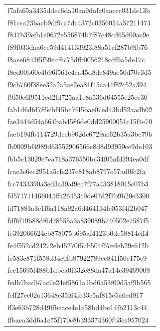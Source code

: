 \begin{tabular}{l}
f7afa65a3435ddee6da10aa9dafa0aaccc031de13b \\
f81cca23bacb9df9ca7dc4372c0356054a57211474 \\
f847b39efb1e0672e556874b7f87c48cd65d00ac9e \\
f89f033daa6ce59d414133923f88a51ef287b9fb76 \\
f8aee6843f5f59eaf6c75dfb0056218cdf6a5de17c \\
f8ed00b60c4b96f561e4ca45d8dc849ae50d70c3d5 \\
f9cb760f38ee32a2a5ae2ea81f45ca44f82c52a394 \\
f9f50e6f9511ed2fd725aa1e8a536d64555e25cc30 \\
fab1d6dfd785cbf45bc7f45bae07ed43bd52aadb02 \\
fae3444d54a664bab4586de0dd25900051c15f4e70 \\
faeb194fb114729dccb902dc6729ae62b35a3be79b \\
fb9009bf4989d63552906566c8d8d93950ee9de103 \\
fbb5c13029e7ca718a376550bc34f05afd394ea0df \\
fcac3e6ee2951a5cfe237e818ab8797e57ad0fc2fa \\
fcc7433390a3ed3a39af9ec7f77a433818015c07b3 \\
fd571711466044ffa26453c9de07d2f7b9b20e3300 \\
fd71883a3c1f6a118a92a6d464134fe053f4f2b047 \\
fdf6f19b88df6d78555a3a839089b740502e7587f5 \\
fe392066624cb878075b695af4123b0de58814cff4 \\
fe4f552cd24272eb45270f57b504f67edeb29e612b \\
fe583c871f558d34c0fb87922789ec841f50e175c9 \\
fec15695f488b1dbea0f332c88da47a14c39469009 \\
fedb7badb7ac7e24ef5861a1bd6a53f00d5af9b565 \\
feff27ee02a13648e35f64fe33e5af815c5a6ed917 \\
ff3e63b728d49ffbeace4e1e58bd4be14fb2113c44 \\
ffbaca3dd6a1c75f170c8b393374360fb3ec957024 \\
\bottomrule
\end{tabular}
